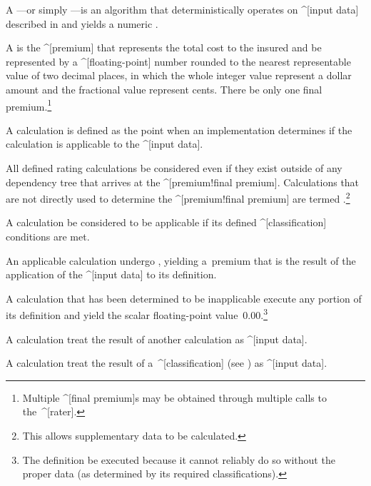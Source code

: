 
A ---or simply ---is an algorithm that
deterministically operates on ^[input data] described in
 and yields a numeric .

A  is the ^[premium] that represents the total cost
to the insured and \shall be represented by a ^[floating-point] number rounded
to the nearest representable value of two decimal places, in which the whole
integer value \shall represent a dollar amount and the fractional value \shall
represent cents. There \shall be only one final premium.\footnote{Multiple
^[final premium]s may be obtained through multiple calls to the~^[rater].}

A calculation  is defined as the point when an
implementation determines if the calculation is applicable to the ^[input data].

All defined rating calculations \shall be considered even if they exist outside
of any dependency tree that arrives at the ^[premium!final premium].
Calculations that are not directly used to determine the ^[premium!final
premium] are termed .\footnote{This
allows supplementary data to be calculated.}

 A calculation \shall be
considered to be applicable if its defined
^[classification] conditions are met.

An applicable calculation \shall undergo , yielding
a~premium that is the result of the application of the ^[input data] to its
definition.

A calculation that has been determined to be inapplicable \shallnot execute any
portion of its definition and \shall yield the scalar floating-point
value~$0.00$.\footnote{The definition \shallnot be executed because it cannot
reliably do so without the proper data (as determined by its required
classifications).}

A calculation \may treat the result of another calculation as ^[input data].

A calculation \may treat the result of a~^[classification] (see
) as ^[input data].

